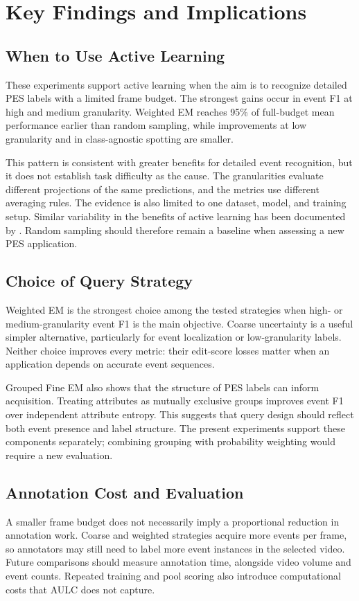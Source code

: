 \section{Key Findings and Implications}
\label{sec:Interpretation of Results}

\subsection{When to Use Active Learning}
These experiments support active learning when the aim is to recognize detailed PES labels with a limited frame budget. The strongest gains occur in event F1 at high and medium granularity. Weighted EM reaches 95\% of full-budget mean performance earlier than random sampling, while improvements at low granularity and in class-agnostic spotting are smaller.

This pattern is consistent with greater benefits for detailed event recognition, but it does not establish task difficulty as the cause. The granularities evaluate different projections of the same predictions, and the metrics use different averaging rules. The evidence is also limited to one dataset, model, and training setup. Similar variability in the benefits of active learning has been documented by \textcite{munjal_towards_2022}. Random sampling should therefore remain a baseline when assessing a new PES application.

\subsection{Choice of Query Strategy}
Weighted EM is the strongest choice among the tested strategies when high- or medium-granularity event F1 is the main objective. Coarse uncertainty is a useful simpler alternative, particularly for event localization or low-granularity labels. Neither choice improves every metric: their edit-score losses matter when an application depends on accurate event sequences.

Grouped Fine EM also shows that the structure of PES labels can inform acquisition. Treating attributes as mutually exclusive groups improves event F1 over independent attribute entropy. This suggests that query design should reflect both event presence and label structure. The present experiments support these components separately; combining grouping with probability weighting would require a new evaluation.

\subsection{Annotation Cost and Evaluation}
A smaller frame budget does not necessarily imply a proportional reduction in annotation work. Coarse and weighted strategies acquire more events per frame, so annotators may still need to label more event instances in the selected video. Future comparisons should measure annotation time, alongside video volume and event counts. Repeated training and pool scoring also introduce computational costs that AULC does not capture.

